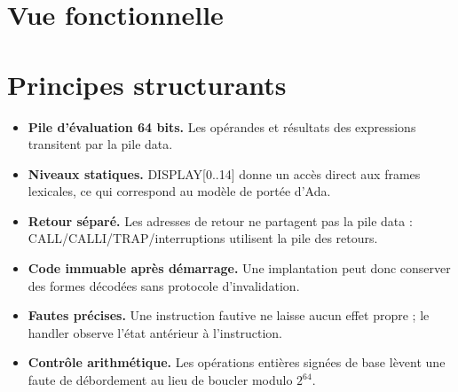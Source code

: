 \documentclass[10pt,a4paper,twoside,openany]{book}
\newcommand{\reg}[1]{\textsc{#1}}
\begin{document}
\section{Vue fonctionnelle}
\begin{center}
\end{center}

\section{Principes structurants}
\begin{itemize}
\item \textbf{Pile d'évaluation 64 bits.} Les opérandes et résultats des expressions transitent par la pile data.
\item \textbf{Niveaux statiques.} \reg{DISPLAY[0..14]} donne un accès direct aux frames lexicales, ce qui correspond au modèle de portée d'Ada.
\item \textbf{Retour séparé.} Les adresses de retour ne partagent pas la pile data : CALL/CALLI/TRAP/interruptions utilisent la pile des retours.
\item \textbf{Code immuable après démarrage.} Une implantation peut donc conserver des formes décodées sans protocole d'invalidation.
\item \textbf{Fautes précises.} Une instruction fautive ne laisse aucun effet propre ; le handler observe l'état antérieur à l'instruction.
\item \textbf{Contrôle arithmétique.} Les opérations entières signées de base lèvent une faute de débordement au lieu de boucler modulo $2^{64}$.
\end{itemize}
\end{document}
